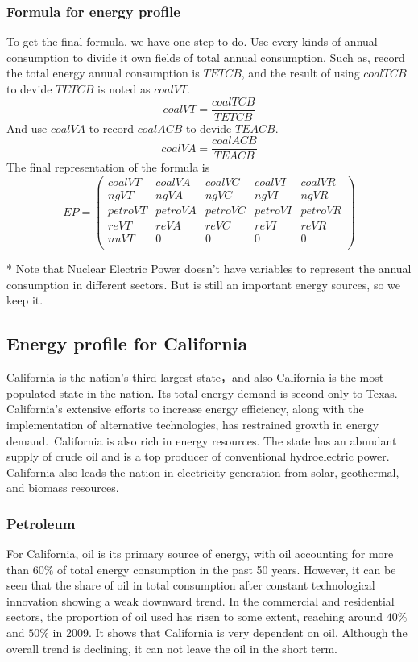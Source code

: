 \documentclass{mcmthesis}
\begin{document}
\subsubsection{Formula for energy profile}
To get the final formula, we have one step to do. Use every kinds of annual consumption to divide it own fields of total annual consumption.
Such as, record the total energy annual consumption is $TETCB$, and the result of using $coalTCB$ to devide $TETCB$ is noted as $coalVT$.
$$coalVT = \frac{coalTCB}{TETCB}$$
And use $coalVA$ to record $coalACB$ to devide $TEACB$.
$$coalVA = \frac{coalACB}{TEACB}$$
The final representation of the formula is
$$
  EP =
  \begin{pmatrix}
  coalVT & coalVA & coalVC & coalVI & coalVR  \\
  ngVT & ngVA & ngVC & ngVI & ngVR \\
  petroVT &　petroVA & petroVC & petroVI & petroVR \\
  reVT & reVA & reVC & reVI & reVR \\
  nuVT & 0 & 0 & 0 & 0\\
  \end{pmatrix}
$$

* Note that Nuclear Electric Power doesn't have variables to represent the annual consumption in different sectors.
But is still an important energy sources, so we keep it.

\subsection{Energy profile for California}
California is the nation's third-largest state，and also California is the most populated state in the nation. Its total energy demand is second only to Texas.
California's extensive efforts to increase energy efficiency, along with the implementation of alternative technologies,
has restrained growth in energy demand. California is also rich in energy resources.
The state has an abundant supply of crude oil and is a top producer of conventional hydroelectric power.
California also leads the nation in electricity generation from solar, geothermal, and biomass resources.
\subsubsection{Petroleum}
  For California, oil is its primary source of energy, with oil accounting for more than $60\%$ of total energy consumption in the past 50 years.
  However, it can be seen that the share of oil in total consumption after constant technological innovation showing a weak downward trend.
  In the commercial and residential sectors, the proportion of oil used has risen to some extent, reaching around $40\%$ and $50\%$ in 2009.
  It shows that California is very dependent on oil. Although the overall trend is declining, it can not leave the oil in the short term.
\end{document}
